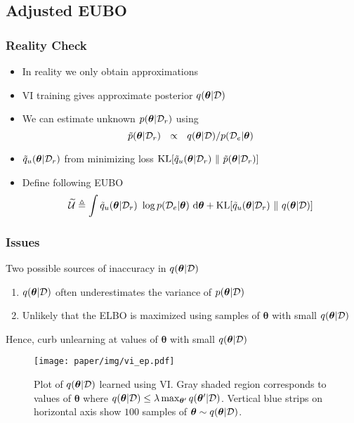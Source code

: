 \documentclass[pdf]{beamer}
\begin{document}
\subsection{Adjusted EUBO}
\begin{frame}
  \frametitle{Reality Check}
  \begin{itemize}
    \item In reality we only obtain approximations
    \item VI training gives approximate posterior $q(\bm{\theta}|\mathcal{D})$ 
    \item We can estimate unknown $p(\bm{\theta}|\mathcal{D}_r)$ using 
    \[
      \tilde{p}(\bm{\theta}|\dc)\ \  \propto\ \ {q(\bm{\theta}|\da)}/{p(\dr| \bm{\theta})}
    \]
    \item $\tilde{q}_u(\bm{\theta}|\mathcal{D}_r)$ from minimizing loss $\text{KL}[\eubo(\bm{\theta}|\dc)\ \Vert\ \tilde{p}(\bm{\theta}|\dc)]$
    \item Define following EUBO
    \[
      \widetilde{\mcl{U}} \triangleq \int \eubo(\bm{\theta}|\dc)\ \log p(\dr|\bm{\theta})\ \text{d}\bm{\theta} + \text{KL}[\eubo(\bm{\theta}|\dc)\ \Vert\ q(\bm{\theta}|\da)]  
    \]
    \end{itemize}
\end{frame}


\begin{frame}
  \frametitle{Issues}
  Two possible sources of inaccuracy in $q(\bm{\theta}|\mathcal{D})$
  \begin{enumerate}
    \item $q(\bm{\theta}|\mathcal{D})$ often underestimates the variance of $p(\bm{\theta}|\mathcal{D})$
    \item Unlikely that the ELBO is maximized using samples of $\bm{\theta}$ with small $q(\bm{\theta}|\mathcal{D})$
  \end{enumerate}
  Hence, curb unlearning at values of $\bm{\theta}$ with small $q(\bm{\theta}|\mathcal{D})$
  \begin{figure}
    \centering
    \texttt{[image: paper/img/vi\_ep.pdf]}
    \caption{Plot of  $q(\bm{\theta}|\mathcal{D})$ learned using VI. Gray shaded region corresponds to values of $\bm{\theta}$ where $q(\bm{\theta}|\mathcal{D}) \le \lambda \max_{\bm{\theta}'} q(\bm{\theta}'|\mathcal{D})$. Vertical blue strips on  horizontal axis show $100$ samples of $\bm{\theta} \sim q(\bm{\theta}|\mathcal{D})$.}
    \label{fig:adjustedvi}
    \end{figure}
\end{frame}
\end{document}
